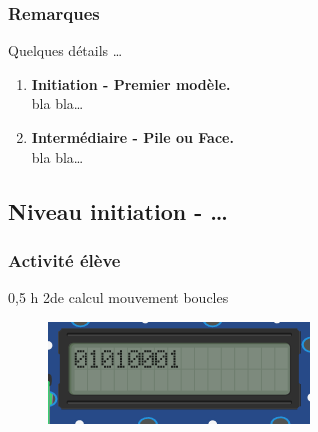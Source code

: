 \subsubsection{Remarques}


\begin{methode}
    Quelques détails
    \ldots %
    
    \begin{enumerate}
        \item \textbf{Initiation - Premier modèle.} \\
            bla bla\ldots %
        \item \textbf{Intermédiaire - Pile ou Face.}\\
            bla bla\ldots %
    \end{enumerate}
\end{methode}

%
%

\newpage

\subsection{Niveau initiation - \ldots}

\subsubsection{Activité élève}

\cartouche
{0,5 h}         %
{2de}           %
{calcul}        %
{mouvement}     %
{boucles}       %


\begin{figure}
    \includegraphics[width=\linewidth]{res/st-pf-00.png}
\end{figure}


